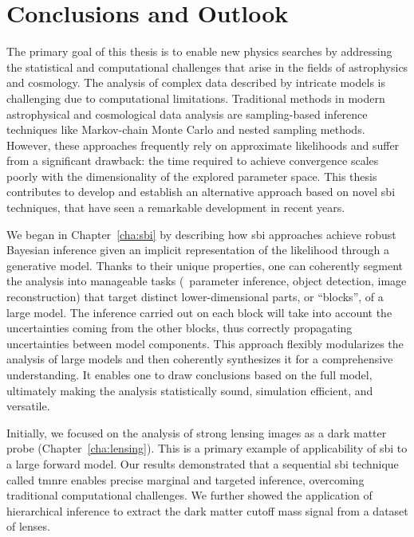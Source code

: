 \chapter{Conclusions and Outlook} \label{cha:conclusions}

The primary goal of this thesis is to enable new physics searches by addressing the statistical and computational challenges that arise in the fields of astrophysics and cosmology. 
The analysis of complex data described by intricate models is challenging due to computational limitations. Traditional methods in modern astrophysical and cosmological data analysis are sampling-based inference techniques like Markov-chain Monte Carlo and nested sampling methods. However, these approaches frequently rely on approximate likelihoods and suffer from a significant drawback: the time required to achieve convergence scales poorly with the dimensionality of the explored parameter space. This thesis contributes to develop and establish an alternative approach based on novel \gls*{sbi} techniques, that have seen a remarkable development in recent years. 

We began in Chapter~\ref{cha:sbi} by describing how \gls*{sbi} approaches achieve robust Bayesian inference given an implicit representation of the likelihood through a generative model. Thanks to their unique properties, one can coherently segment the analysis into manageable tasks (\eg~parameter inference, object detection, image reconstruction) that target distinct lower-dimensional parts, or “blocks”, of a large model. The inference carried out on each block will take into account the uncertainties coming from the other blocks, thus correctly propagating uncertainties between model components. This approach flexibly modularizes the analysis of large models and then coherently synthesizes it for a comprehensive understanding. It enables one to draw conclusions based on the full model, ultimately making the analysis statistically sound, simulation efficient, and versatile. 

Initially, we focused on the analysis of strong lensing images as a dark matter probe (Chapter~\ref{cha:lensing}). This is a primary example of applicability of \gls*{sbi} to a large forward model. Our results demonstrated that a sequential \gls*{sbi} technique called \gls*{tmnre} enables precise marginal and targeted inference, overcoming traditional computational challenges. We further showed the application of hierarchical inference to extract the dark matter cutoff mass signal from a dataset of lenses.

